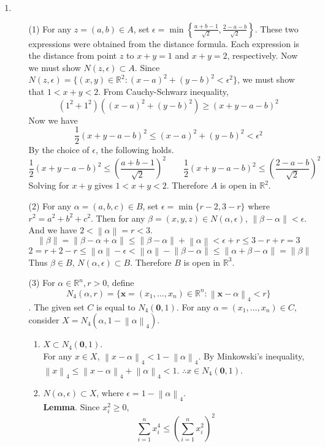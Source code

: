 \documentclass[12pt]{report}
\newcommand{\numl}[1]{\item[\large\textbf{\sffamily #1.}]}
\newcommand{\bb}[1]{\mathbb{#1}}
\newcommand{\rmbf}[1]{\mathrm{\mathbf{#1}}}
\newcommand{\norm}[1]{\left\lVert#1\right\rVert}
\newcommand{\ds}{\displaystyle}
\begin{document}
\begin{enumerate}
\numl{7}
\begin{enumerate}
	\item[(1)] For any $z = (a, b)\in A$, set $\epsilon = \min\left\{\ds \frac{a+b-1}{\sqrt{2}}, \frac{2-a-b}{\sqrt{2}} \right\}$. These two expressions were obtained from the distance formula. Each expression is the distance from point $z$ to $x+y=1$ and $x+y=2$, respectively. Now we must show $N(z, \epsilon) \subset A$. Since $N(z, \epsilon) = \{(x, y)\in \bb{R}^2: (x - a)^2 + (y - b)^2 < \epsilon^2 \}$, we must show that $1<x+y<2$. From Cauchy-Schwarz inequality, $$(1^2+1^2)\left( (x-a)^2+(y-b)^2\right)\geq (x+y-a-b)^2 $$
	Now we have $$\frac{1}{2}(x+y-a-b)^2\leq (x-a)^2+(y-b)^2 < \epsilon ^2 $$
	By the choice of $\epsilon$, the following holds. $$\frac{1}{2}(x+y-a-b)^2\leq \left(\frac{a+b-1}{\sqrt{2}}\right)^2 \qquad \frac{1}{2}(x+y-a-b)^2\leq \left(\frac{2-a-b}{\sqrt{2}}\right)^2$$
	Solving for $x+y$ gives $1<x+y<2$. Therefore $A$ is open in $\bb{R}^2$.
	\item[(2)] For any $\alpha = (a, b, c)\in B$, set $\epsilon = \min\{r-2, 3-r \}$ where $r^2 = a^2+b^2+c^2$. Then for any $\beta = (x, y, z) \in N(\alpha, \epsilon)$, $\norm{\beta - \alpha} < \epsilon$. And we have $2 < \norm{\alpha} = r <3 $. $$\norm{\beta} = \norm{\beta - \alpha + \alpha}\leq \norm{\beta - \alpha} +\norm{\alpha} < \epsilon + r \leq 3-r + r = 3$$
	$$2 = r + 2-r \leq \norm{\alpha} - \epsilon < \norm{\alpha} -\norm{\beta-\alpha} \leq \norm{\alpha + \beta - \alpha} = \norm{\beta}$$
	Thus $\beta \in B$, $N(\alpha, \epsilon) \subset B$. Therefore $B$ is open in $\bb{R}^3$.
	\item[(3)] For $\alpha \in \bb{R}^n, r>0$, define $$N_4\left(\alpha, r\right) = \{ \rmbf{x} = (x_1, \dots, x_n)\in \bb{R}^n : \norm{\rmbf{x} - \alpha}_4 < r  \}$$.  The given set $C$ is equal to $N_4(\rmbf{0}, 1)$. For any $\alpha = (x_1, \dots, x_n) \in C$, consider $X = N_4\left(\alpha,  {1-\norm{\alpha}_4}\right)$.
	\begin{enumerate}
		\item $X\subset N_4(\rmbf{0}, 1)$.\\
		For any $x\in X$, $\norm{x - \alpha}_4 < 1-\norm{\alpha}_4$. By Minkowski's inequality, $\norm{x}_4\leq \norm{x-\alpha}_4 + \norm{\alpha}_4 < 1$. $\therefore x\in N_4(\rmbf{0}, 1)$.
		\item $N(\alpha, \epsilon) \subset X$, where $\epsilon = 1-\norm{\alpha}_4$.\\\textbf{Lemma}. Since $x_i^2\geq 0$, $$\sum_{i=1}^nx_i^4 \leq \left(\sum_{i=1}^{n}x_i^2\right)^2$$\\

\end{enumerate}
\end{enumerate}
\end{enumerate}
\end{document}
